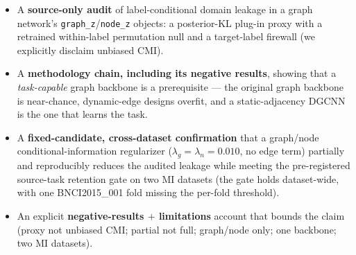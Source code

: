 \begin{itemize}
  \item[\textbf{(C1)}] A \textbf{source-only audit} of label-conditional domain leakage in a graph
  network's \texttt{graph\_z}/\texttt{node\_z} objects: a posterior-KL plug-in proxy with a retrained
  within-label permutation null and a target-label firewall (we explicitly disclaim unbiased CMI).
  \item[\textbf{(C2)}] A \textbf{methodology chain, including its negative results}, showing that a
  \emph{task-capable} graph backbone is a prerequisite --- the original graph backbone is near-chance,
  dynamic-edge designs overfit, and a static-adjacency DGCNN is the one that learns the task.
  \item[\textbf{(C3)}] A \textbf{fixed-candidate, cross-dataset confirmation} that a graph/node
  conditional-information regularizer ($\lambda_g = \lambda_n = 0.010$, no edge term) partially and
  reproducibly reduces the audited leakage while meeting the pre-registered source-task retention gate on
  two MI datasets (the gate holds dataset-wide, with one BNCI2015\_001 fold missing the per-fold threshold).
  \item[\textbf{(C4)}] An explicit \textbf{negative-results $+$ limitations} account that bounds the claim
  (proxy not unbiased CMI; partial not full; graph/node only; one backbone; two MI datasets).
\end{itemize}
